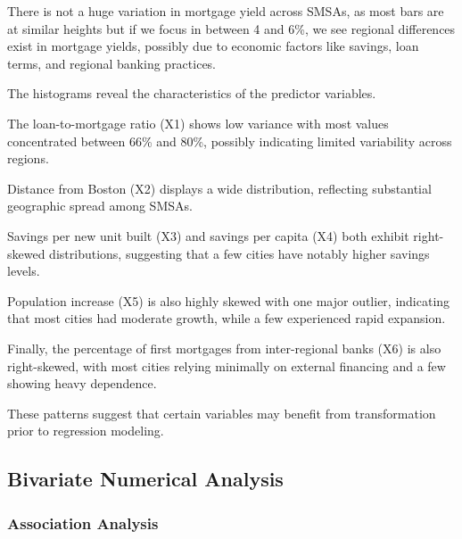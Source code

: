 \documentclass[
  11pt,
]{article}
\begin{document}
There is not a huge variation in mortgage yield across SMSAs, as most
bars are at similar heights but if we focus in between 4 and 6\%, we see
regional differences exist in mortgage yields, possibly due to economic
factors like savings, loan terms, and regional banking practices.

The histograms reveal the characteristics of the predictor variables.

The loan-to-mortgage ratio (X1) shows low variance with most values
concentrated between 66\% and 80\%, possibly indicating limited
variability across regions.

Distance from Boston (X2) displays a wide distribution, reflecting
substantial geographic spread among SMSAs.

Savings per new unit built (X3) and savings per capita (X4) both exhibit
right-skewed distributions, suggesting that a few cities have notably
higher savings levels.

Population increase (X5) is also highly skewed with one major outlier,
indicating that most cities had moderate growth, while a few experienced
rapid expansion.

Finally, the percentage of first mortgages from inter-regional banks
(X6) is also right-skewed, with most cities relying minimally on
external financing and a few showing heavy dependence.

These patterns suggest that certain variables may benefit from
transformation prior to regression modeling.

\subsection{Bivariate Numerical
Analysis}\label{bivariate-numerical-analysis}

\subsubsection{Association Analysis}\label{association-analysis}
\end{document}
